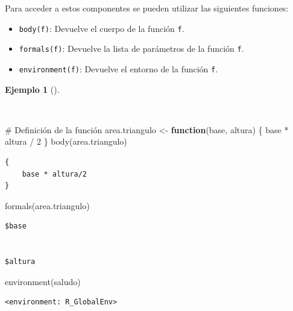 \documentclass[
  a4paper,
]{scrreport}
\newenvironment{Shaded}{\begin{snugshade}}{\end{snugshade}}
\newcommand{\CommentTok}[1]{\textcolor[rgb]{0.37,0.37,0.37}{#1}}
\newcommand{\ControlFlowTok}[1]{\textcolor[rgb]{0.00,0.23,0.31}{\textbf{#1}}}
\newcommand{\DecValTok}[1]{\textcolor[rgb]{0.68,0.00,0.00}{#1}}
\newcommand{\FunctionTok}[1]{\textcolor[rgb]{0.28,0.35,0.67}{#1}}
\newcommand{\NormalTok}[1]{\textcolor[rgb]{0.00,0.23,0.31}{#1}}
\newcommand{\OtherTok}[1]{\textcolor[rgb]{0.00,0.23,0.31}{#1}}
\newcommand{\SpecialCharTok}[1]{\textcolor[rgb]{0.37,0.37,0.37}{#1}}
\providecommand{\tightlist}{%
  \setlength{\itemsep}{0pt}\setlength{\parskip}{0pt}}\usepackage{longtable,booktabs,array}
\theoremstyle{definition}
\theoremstyle{definition}
\newtheorem{example}{Ejemplo}[chapter]
\theoremstyle{remark}
\begin{document}
Para acceder a estos componentes se pueden utilizar las siguientes
funciones:

\begin{itemize}
\tightlist
\item
  \texttt{body(f)}: Devuelve el cuerpo de la función \texttt{f}.
\item
  \texttt{formals(f)}: Devuelve la lista de parámetros de la función
  \texttt{f}.
\item
  \texttt{environment(f)}: Devuelve el entorno de la función \texttt{f}.
\end{itemize}

\begin{example}[]\protect\hypertarget{exm-componentes-funcion}{}\label{exm-componentes-funcion}

~

\begin{Shaded}
\begin{Highlighting}[]
\CommentTok{\# Definición de la función}
\NormalTok{area.triangulo }\OtherTok{\textless{}{-}} \ControlFlowTok{function}\NormalTok{(base, altura) \{}
\NormalTok{  base }\SpecialCharTok{*}\NormalTok{ altura }\SpecialCharTok{/} \DecValTok{2}
\NormalTok{\}}
\FunctionTok{body}\NormalTok{(area.triangulo)}
\end{Highlighting}
\end{Shaded}

\begin{verbatim}
{
    base * altura/2
}
\end{verbatim}

\begin{Shaded}
\begin{Highlighting}[]
\FunctionTok{formals}\NormalTok{(area.triangulo)}
\end{Highlighting}
\end{Shaded}

\begin{verbatim}
$base


$altura
\end{verbatim}

\begin{Shaded}
\begin{Highlighting}[]
\FunctionTok{environment}\NormalTok{(saludo)}
\end{Highlighting}
\end{Shaded}

\begin{verbatim}
<environment: R_GlobalEnv>
\end{verbatim}

\end{example}
\end{document}

